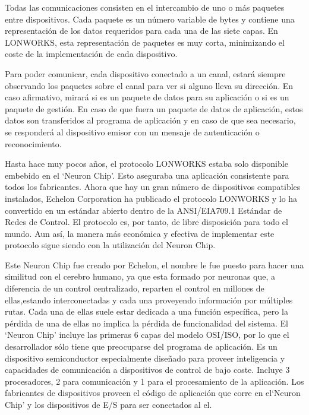 Todas las comunicaciones consisten en el intercambio de uno o m\'as paquetes entre dispositivos. Cada paquete es un número variable de bytes y contiene una representación de los datos requeridos para cada una de las siete capas. En LONWORKS, esta representación de paquetes es muy corta, minimizando el coste de la implementación de cada dispositivo.


Para poder comunicar, cada dispositivo conectado a un canal, estar\'a siempre observando los paquetes sobre el canal para ver si alguno lleva su dirección. En caso afirmativo, mirar\'a si es un paquete de datos para su aplicación o si es un paquete de gestión. En caso de que fuera un paquete de datos de aplicación, estos datos son transferidos al programa de aplicación y en caso de que sea necesario, se responder\'a al dispositivo emisor con un mensaje de autenticación o reconocimiento.


Hasta hace muy pocos años, el protocolo LONWORKS estaba solo disponible embebido en el ‘Neuron Chip’. Esto aseguraba una aplicación consistente para todos los fabricantes. Ahora que hay un gran número de dispositivos compatibles instalados, Echelon Corporation ha publicado el protocolo LONWORKS y lo ha convertido en un est\'andar abierto dentro de la ANSI/EIA709.1 Est\'andar de Redes de Control. El protocolo es, por tanto, de libre disposición para todo el mundo. Aun así, la manera m\'as económica y efectiva de implementar este protocolo sigue siendo con la utilización del Neuron Chip.

Este Neuron Chip fue creado por Echelon, el nombre le fue puesto para hacer una similitud con el cerebro humano, ya que esta formado por neuronas que, a diferencia de un control 
centralizado, reparten el control en millones de ellas,estando interconectadas y cada una proveyendo información por múltiples rutas. Cada una de ellas suele estar dedicada a una función específica, pero la pérdida de una de ellas no implica la pérdida de funcionalidad del sistema. El ‘Neuron Chip’ incluye las primeras 6 capas del modelo OSI/ISO, por lo que el desarrollador sólo tiene que preocuparse del programa de aplicación. Es un dispositivo semiconductor especialmente diseñado para proveer inteligencia y capacidades de comunicación a dispositivos de control de bajo coste. Incluye 3 procesadores, 2 para comunicación y 1 para el procesamiento de la aplicación. Los fabricantes de dispositivos proveen el código de aplicación que corre en el‘Neuron Chip’ y los dispositivos de E/S para ser conectados al el.


